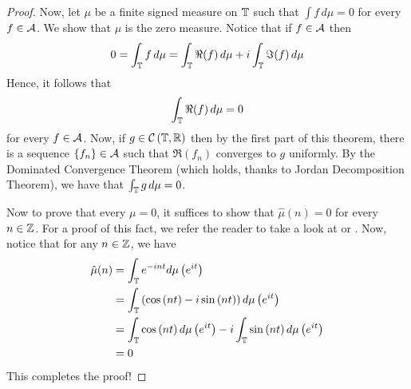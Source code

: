 \begin{proof}
Now, let $\mu$ be a finite signed measure on $\mathbb T$ such that $\int f \, d\mu =0$ for every $f \in {\cal A}$. We show that $\mu$ is the zero measure. Notice that if $f\in {\cal A}$ then
\begin{equation*}
    0=\int_{\mathbb T} f \, d\mu = \int_{\mathbb T} \Re (f) \, d\mu + i\int_{\mathbb T} \Im (f) \, d\mu
\end{equation*}
Hence, it follows that 
\begin{equation*}
    \int_{\mathbb T} \Re (f) \, d\mu = 0
\end{equation*}
for every $f\in {\cal A}$.
Now, if $g\in {\cal C} \left( \mathbb T, \mathbb R \right)$ then by the first part of this theorem, there is a sequence $\left\{ f_{n} \right\} \in {\cal A}$ such that $\Re \left( f_{n} \right) $ converges to $g$ uniformly. By the Dominated Convergence Theorem (which holds, thanks to Jordan Decomposition Theorem), we have that $\int_{\mathbb T} g \, d\mu = 0$. 

Now to prove that every $\mu = 0$, it suffices to show that $\hat{\mu} \left( n \right) = 0$ for every $n\in \mathbb Z$. For a proof of this fact, we refer the reader to take a look at \cite{mashreghi2009representation} or \cite{katznelson2004introduction}. Now, notice that for any $n\in \mathbb Z$, we have
\begin{align*}
    \hat{\mu} (n) &= \int_{\mathbb T} e^{-int} d\mu \left( e^{it} \right) \\
    &=  \int_{\mathbb T} \left(\cos \left( nt \right) - i \sin \left( nt \right) \right) d\mu \left( e^{it} \right) \\
    &= \int_{\mathbb T} \cos \left( nt \right) d\mu \left( e^{it} \right) - i\int_{\mathbb T} \sin \left( nt \right) d\mu \left( e^{it} \right) \\
    &= 0
\end{align*}
This completes the proof!
\end{proof}


